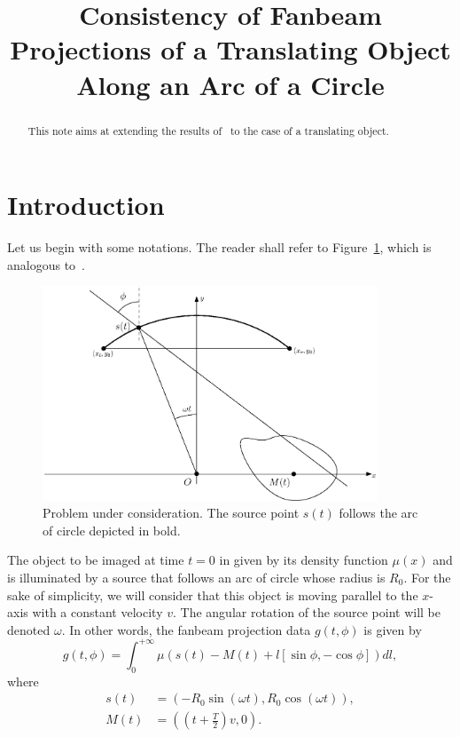 \documentclass[a4paper]{article}
\title{Consistency of Fanbeam Projections of a Translating Object Along an Arc of a Circle}
\author{}
\date{}
\numberwithin{equation}{section}
\begin{document}
\maketitle

\begin{abstract}
This note aims at extending the results of~\cite{clackdoyle2015consistency} to the case of a translating object.
\end{abstract}

\section{Introduction}

Let us begin with some notations. The reader shall refer to Figure~\ref{fig:notations}, which is analogous to~\cite[Figure~2]{clackdoyle2015consistency}.
\begin{figure}[!ht]
	\centering
	\includegraphics[width=10cm]{figs/frame_scanner.eps}
	\caption{Problem under consideration. The source point $s(t)$ follows the arc of circle depicted in bold.\label{fig:notations}}
\end{figure}
The object to be imaged at time $t=0$ in given by its density function $\mu(x)$ and is illuminated by a source that follows an arc of circle whose radius is $R_0$. For the sake of simplicity, we will consider that this object is moving parallel to the $x$-axis with a constant velocity $v$. The angular rotation of the source point will be denoted $\omega$. In other words, the fanbeam projection data $g(t,\phi)$ is given by
\begin{equation}
	g(t,\phi) = \int_0^{+\infty} \mu \left( s(t) - M(t) + l \left[ \sin \phi, -\cos \phi \right] \right) dl,
\end{equation}
where
\begin{align}
s(t) & = \left( -R_0 \sin(\omega t), R_0 \cos(\omega t) \right), \\
M(t) & =  \left( \left( t + \frac{T}{2} \right)v, 0 \right).
\end{align}
\end{document}
